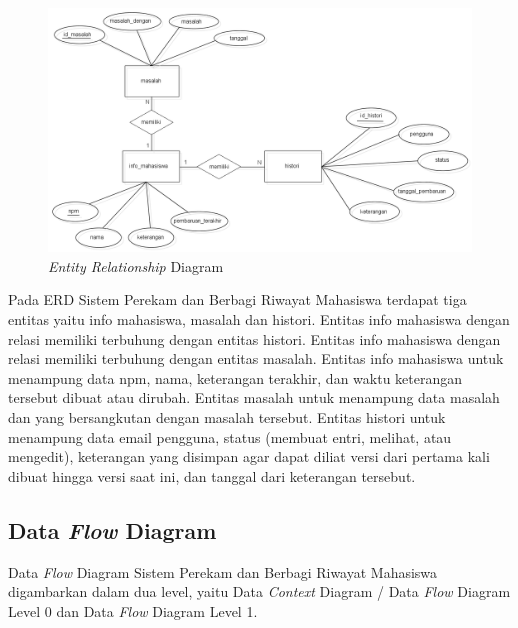 \begin{figure}[ht]
\centering
\includegraphics[scale=0.4]{Gambar/ERD.png}
\caption[{\it Entity Relationship} Diagram]{{\it Entity Relationship} Diagram} 
\label{fig:erd}
\end{figure}

Pada ERD Sistem Perekam dan Berbagi Riwayat Mahasiswa terdapat tiga entitas yaitu info mahasiswa, masalah dan histori. Entitas info mahasiswa dengan relasi memiliki terbuhung dengan entitas histori. Entitas info mahasiswa dengan relasi memiliki terbuhung dengan entitas masalah. Entitas info mahasiswa untuk menampung data npm, nama, keterangan terakhir, dan waktu keterangan tersebut dibuat atau dirubah. Entitas masalah untuk menampung data masalah dan yang bersangkutan dengan masalah tersebut. Entitas histori untuk menampung data email pengguna, status (membuat entri, melihat, atau mengedit), keterangan yang disimpan agar dapat diliat versi dari pertama kali dibuat hingga versi saat ini, dan tanggal dari keterangan tersebut. 

\subsection{Data {\it Flow} Diagram}
Data {\it Flow} Diagram Sistem Perekam dan Berbagi Riwayat Mahasiswa digambarkan dalam dua level, yaitu Data {\it Context} Diagram / Data {\it Flow} Diagram Level 0 dan Data {\it Flow} Diagram Level 1.

